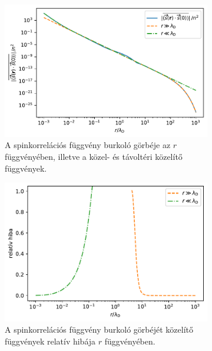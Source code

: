 \documentclass[a4paper,12pt,titlepage]{article}
\begin{document}
\begin{figure}[h!]
	\centering
	\begin{subfigure}[t]{0.48\linewidth}
		\centering
		\includegraphics[width=\linewidth]{s.pdf}
		\caption{\centering A spinkorrelációs függvény burkoló görbéje az $r$ függvényében, illetve a közel- \newline és távoltéri közelítő függvények.}
	\end{subfigure}%
	\begin{subfigure}[t]{0.48\linewidth}
		\centering
		\includegraphics[width=0.96\linewidth]{s_error.pdf}
		\caption{\centering A spinkorrelációs függvény burkoló görbéjét közelítő függvények relatív hibája \newline $r$ függvényében.}
	\end{subfigure}
	\caption{}
	\label{s-fig}
\end{figure}
\end{document}

